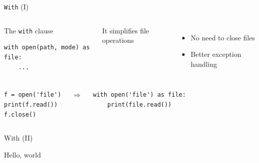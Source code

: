 \documentclass[10pt,compress]{beamer} %
\begin{document}
\begin{frame}[fragile]{\texttt{With} (I)}
	\begin{columns}
	\begin{block}{The \texttt{with} clause}
	\vspace{-0.2cm}
\begin{verbatim}
with open(path, mode) as file:
    ...
\end{verbatim}
	\end{block}


	It simplifies file operations
	\begin{itemize}
	\item No need to close files
    \item Better exception handling
	\end{itemize}
    \end{columns}

    
	\begin{columns}
	\begin{exampleblock}{}
	\begin{verbatim}
f = open('file')
print(f.read())
f.close()
\end{verbatim}
    \end{exampleblock}

    $\Rightarrow$

	\begin{exampleblock}{}
	\begin{verbatim}
with open('file') as file:
    print(file.read())
\end{verbatim}
    \end{exampleblock}

    \end{columns}
\end{frame}

\begin{frame}[fragile]{With (II)}
	\begin{exampleblock}{Hello, world}
	\vspace{-0.2cm}
	
	\vspace{-0.2cm}
	\end{exampleblock}
\end{frame}
\end{document}
